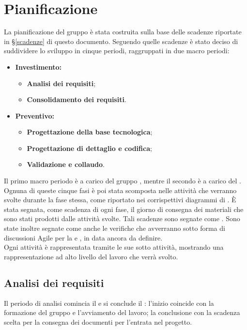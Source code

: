 \documentclass[PianoDiProgetto.tex]{subfiles}
\begin{document}
\chapter{Pianificazione}
La pianificazione del gruppo \gruppo è stata costruita sulla base delle scadenze riportate in \S \ref{scadenze} di questo documento. Seguendo quelle scadenze è stato deciso di suddividere lo sviluppo in cinque periodi, raggruppati in due macro periodi:
\begin{itemize}
	\item \textbf{Investimento:}
		\begin{itemize}
			\item \textbf{Analisi dei requisiti};
			\item \textbf{Consolidamento dei requisiti}.
		\end{itemize}
	\item \textbf{Preventivo:}
		\begin{itemize}
			\item \textbf{Progettazione della base tecnologica};
			\item \textbf{Progettazione di dettaglio e codifica};
			\item \textbf{Validazione e collaudo}.
		\end{itemize}
\end{itemize}
Il primo macro periodo è a carico del gruppo \gruppo, mentre il secondo è a carico del .\\
Ognuna di queste cinque fasi è poi stata scomposta nelle attività che verranno svolte durante la fase stessa, come riportato nei corrispettivi diagrammi di . \`{E} stata segnata, come scadenza di ogni fase, il giorno di consegna dei materiali che sono stati prodotti dalle attività svolte. Tali scadenze sono segnate come .
Sono state inoltre segnate come  anche le verifiche che avverranno sotto forma di discussioni Agile per la \tb e \pb, in data ancora da definire.\\ Ogni attività è rappresentata tramite le sue sotto attività, mostrando una rappresentazione ad alto livello del lavoro che verrà svolto.
\newpage

\section{Analisi dei requisiti}
Il periodo di analisi comincia il  e si conclude il : l'inizio coincide con la formazione del gruppo e l'avviamento del lavoro; la conclusione con la scadenza scelta per la consegna dei documenti per l'entrata nel progetto.
\end{document}

